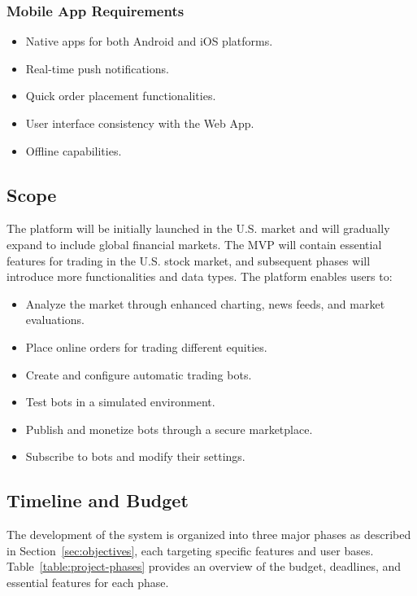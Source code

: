\subsubsection{Mobile App Requirements}
\begin{itemize}
  \item Native apps for both Android and iOS platforms.
  \item Real-time push notifications.
  \item Quick order placement functionalities.
  \item User interface consistency with the Web App.
  \item Offline capabilities.
\end{itemize}

\subsection{Scope}
The platform will be initially launched in the U.S. market and will gradually expand to include global financial markets. The MVP will contain essential features for trading in the U.S. stock market, and subsequent phases will introduce more functionalities and data types. The platform enables users to:

\begin{itemize}
  \item Analyze the market through enhanced charting, news feeds, and market evaluations.
  \item Place online orders for trading different equities.
  \item Create and configure automatic trading bots.
  \item Test bots in a simulated environment.
  \item Publish and monetize bots through a secure marketplace.
  \item Subscribe to bots and modify their settings.
\end{itemize}

\subsection{Timeline and Budget}

The development of the system is organized into three major phases as described in Section~\ref{sec:objectives}, each targeting specific features and user bases. Table~\ref{table:project-phases} provides an overview of the budget, deadlines, and essential features for each phase.

